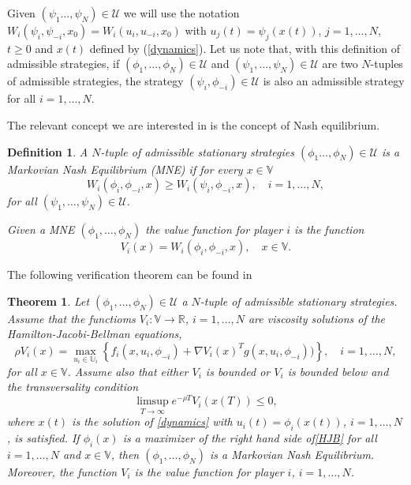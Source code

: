 \documentclass[12pt]{article}
\newtheorem{theorem}{Theorem}
\newtheorem{definition}{Definition}
\begin{document}
Given $(\psi_1\dots,\psi_N)\in\mathcal{U}$ we will use the notation
$W_{i}(\psi_i,\psi_{-i},x_0)=W_{i}({u}_i,{u}_{-i},x_0)$ with $u_{j}(t)=\psi_j(x(t))$, $j=1,\dots, N$, $t\ge 0$ and $x(t)$ defined by (\ref{dynamics}).
Let us note that, with this definition of admissible strategies,  if $(\phi_1,\dots,\phi_N)\in\mathcal{U}$ and $(\psi_1,\dots,\psi_N)\in\mathcal{U}$ are two $N$-tuples of admissible strategies, the strategy $(\psi_i,\phi_{-i})\in\mathcal{U}$ is also an admissible strategy for all $i=1,\dots,N$.


The relevant concept we are interested in is the concept of  Nash equilibrium.
\begin{definition}\label{value_function_definition}
A $N$-tuple of admissible stationary strategies $(\phi_1\dots,\phi_N)\in\mathcal{U}$ is a Markovian Nash Equilibrium (MNE) if for every $x\in\mathbb{V}$
\begin{equation}\label{nash}
W_i(\phi_i,\phi_{-i},x)\ge W_i(\psi_i,\phi_{-i},x),\quad i=1,\dots,N,
\end{equation}
for all $(\psi_1,\dots,\psi_N)\in\mathcal{U}$.

Given a MNE $(\phi_1,\dots,\phi_N)$ the value function for player $i$ is the function
$$V_i(x)=W_i(\phi_i,\phi_{-i},x),\quad x\in\mathbb{V}.$$
\end{definition}	
The following verification theorem can be found in \cite[Theorem 4.1]{Dockner}
\begin{theorem}\label{verification}
Let $(\phi_1,\dots,\phi_N)\in\mathcal{U}$ a $N$-tuple of admissible stationary strategies. Assume that { the functioms $V_i:\mathbb{V}\rightarrow\mathbb{R}$, $i=1,\dots,N$ are viscosity solutions of the Hamilton-Jacobi-Bellman equations, \cite{wagener}}
\begin{equation}\label{HJB}
\rho V_i(x)=\max_{u_i\in\mathbb{U}_i}\left\{f_i(x,u_i,\phi_{-i})+\nabla V_i(x)^Tg(x,u_i,\phi_{-i}))\right\}, \quad i=1,\dots,N,
\end{equation}
for all  $x\in\mathbb{V}$.
Assume also that either $V_i$ is bounded or $V_i$ is bounded below and the transversality condition
\begin{equation}\label{transversality}
\limsup_{T\rightarrow\infty}e^{-\rho T}V_i(x(T)) \le 0,
\end{equation}
where $x(t)$ is the solution of  \eqref{dynamics} with $u_i(t)=\phi_i(x(t))$, $i=1,\dots, N$, is satisfied.
If $\phi_i(x)$ is a maximizer of the right hand side of\eqref{HJB} for all $i=1,\dots,N$ and $x\in\mathbb{V}$, then $(\phi_1,\dots,\phi_N)$ is a Markovian Nash Equilibrium. Moreover, the function $V_i$ is the value function for player $i$, $i=1,\dots, N$.
\end{theorem}
\end{document}
